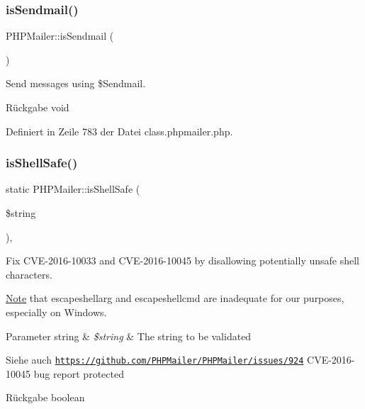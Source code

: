 \subsubsection{\texorpdfstring{is\+Sendmail()}{isSendmail()}}
{\footnotesize\ttfamily P\+H\+P\+Mailer\+::is\+Sendmail (\begin{DoxyParamCaption}{ }\end{DoxyParamCaption})}

Send messages using \$\+Sendmail. \begin{DoxyReturn}{Rückgabe}
void 
\end{DoxyReturn}


Definiert in Zeile 783 der Datei class.\+phpmailer.\+php.

\mbox{\label{class_p_h_p_mailer_a1456f83c2c70d379c7b66969db8a1519}} 
\subsubsection{\texorpdfstring{is\+Shell\+Safe()}{isShellSafe()}}
{\footnotesize\ttfamily static P\+H\+P\+Mailer\+::is\+Shell\+Safe (\begin{DoxyParamCaption}\item[{}]{\$string }\end{DoxyParamCaption})\hspace{0.3cm}{\ttfamily [static]}, {\ttfamily [protected]}}

Fix C\+V\+E-\/2016-\/10033 and C\+V\+E-\/2016-\/10045 by disallowing potentially unsafe shell characters.

\mbox{\hyperlink{class_note}{Note}} that escapeshellarg and escapeshellcmd are inadequate for our purposes, especially on Windows. 
\begin{DoxyParams}[1]{Parameter}
string & {\em \$string} & The string to be validated \\
\hline
\end{DoxyParams}
\begin{DoxySeeAlso}{Siehe auch}
\href{https://github.com/PHPMailer/PHPMailer/issues/924}{\tt https\+://github.\+com/\+P\+H\+P\+Mailer/\+P\+H\+P\+Mailer/issues/924} C\+V\+E-\/2016-\/10045 bug report  protected 
\end{DoxySeeAlso}
\begin{DoxyReturn}{Rückgabe}
boolean 
\end{DoxyReturn}


